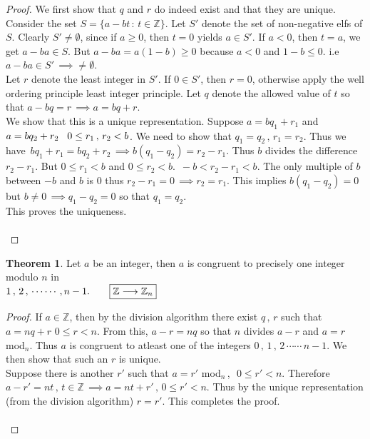 \documentclass[11pt,a4paper]{article}
\theoremstyle{definition}
\newtheorem{thm}{Theorem}[subsection]
\begin{document}
\begin{proof}
We first show that $q$ and $r$ do indeed exist and that they are unique. Consider the set $S=\big\{a - bt\, :\, t\in \mathbb{Z}\big\}$. Let $S'$ denote the set of non-negative elfs of $S$. Clearly $S' \neq \emptyset$, since if $a\geq 0$, then $t = 0$ yields $a\in S'$. If $a<0$, then $t=a$, we get $a  - ba\in S$. But $a - ba = a(1 - b)\geq 0$ because $a < 0$ and $1 - b\leq 0$. i.e $a - ba\in S' \, \implies \neq \emptyset$.\\
Let $r$ denote the least integer in $S'$. If $0\in S'$, then $r = 0$, otherwise apply the well ordering principle least integer principle. Let $q$ denote the allowed value of $t$ so that $a - bq = r\, \implies a = bq + r$.\\
We show that this is a unique representation. Suppose $a = bq_1 + r_1$ and $a = bq_2 + r_2\hspace{0.3cm} 0\leq r_1\, ,\, r_2 < b$. We need to show that $q_1 = q_2\, , \, r_1 = r_2$. Thus we have $\, bq_1 + r_1 = bq_2 + r_2 \, \implies b(q_1 - q_2) = r_2 - r_1$. Thus $b$ divides the difference $r_2 - r_1$. But $0\leq r_1 < b$ and $0\leq r_2 < b$. $\, - b < r_2 - r_1 < b$. The only multiple of $b$ between $-b$ and $b$ is $0$ thus $r_2 - r_1 = 0\, \implies r_2 = r_1$. This implies $b(q_1 - q_2) = 0$ but $b\neq 0\, \implies q_1 - q_2 = 0$ so that $q_1 = q_2$.\\
This proves the uniqueness.\\\\
\end{proof}







\begin{thm}
Let $a$ be an integer, then $a$ is congruent to precisely one integer modulo $n$ in\\ $1\, , \, 2\,   , \, \cdots\cdots, n-1.\hspace{0.7cm}\boxed{\mathbb{Z} \longrightarrow \mathbb{Z}_n}$\\
\end{thm}




\begin{proof}
If $a\in \mathbb{Z}$, then by the division algorithm there exist $q\, , \, r $ such that $ a = nq + r\, \, 0\leq r < n$. From this, $a - r = nq$ so that $n$ divides $a - r$ and $a = r$ mod$_n$. Thus $a$ is congruent to atleast one of the integers $0\, , \, 1\, ,\, 2\, \cdots\cdots\, n-1$. We then show that such an $r$ is unique.\\
Suppose there is another $r'$ such that $a = r'$ mod$_n\,$, $\,\, 0\leq r' <n$. Therefore $a - r' = nt\, , \, t\in \mathbb{Z}  \, \implies a = nt + r'\, , \, 0 \leq r' <n$. Thus by the unique representation (from the division algorithm) $r = r'$. This completes the proof.\\\\
\end{proof}
\end{document}
